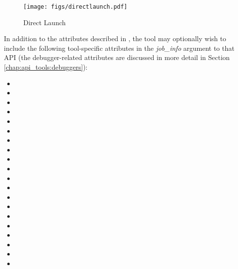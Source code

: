 \begingroup
\begin{figure*}[ht!]
  \begin{center}
    \texttt{[image: figs/directlaunch.pdf]}
  \end{center}
  \caption{Direct Launch}
  \label{fig:dlaunch}
\end{figure*}
\endgroup


In addition to the attributes described in , the tool may optionally wish to include the following tool-specific attributes in the \emph{job_info} argument to that \ac{API} (the debugger-related attributes are discussed in more detail in Section \ref{chap:api_tools:debuggers}):

\begin{itemize}
    \item {}
    \item {}
    \item {}
    \item {}
    \item {}
    \item {}
    \item {}
    \item {}
    \item {}
    \item {}
    \item {}
    \item {}
    \item {}
    \item {}
    \item {}
    \item {}
    \item {}
    \item {}
    \item {}
    \item {}
\end{itemize}

